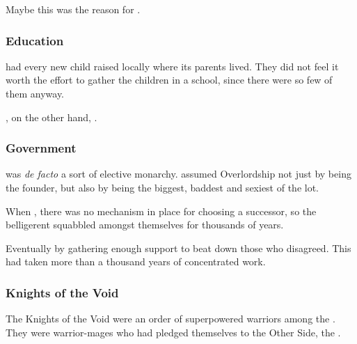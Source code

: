 Maybe this was the reason for .








\subsubsection{Education}
\Mystraacht{} had every new child raised locally where its parents lived. 
They did not feel it worth the effort to gather the children in a school, since there were so few of them anyway. 

\CiriathSepher, on the other hand, . 





\subsubsection{Government}
\Mystraacht{} was \emph{de facto} a sort of elective monarchy. 
\Zachirah{} assumed Overlordship not just by being the founder, but also by being the biggest, baddest and sexiest of the lot. 

When , there was no mechanism in place for choosing a successor, so the belligerent \Mystraacht{} squabbled amongst themselves for thousands of years. 

Eventually  by gathering enough support to beat down those who disagreed. 
This had taken more than a thousand years of concentrated work. 





\subsubsection{Knights of the Void}
The Knights of the Void were an order of superpowered warriors among the \Mystraacht. 
They were warrior-mages who had pledged themselves to the Other Side, the \SitraAchras. 

